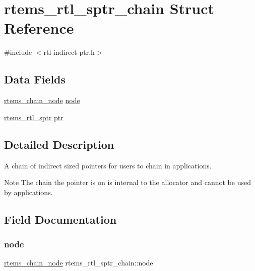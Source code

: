 \hypertarget{structrtems__rtl__sptr__chain}{}\section{rtems\+\_\+rtl\+\_\+sptr\+\_\+chain Struct Reference}
\label{structrtems__rtl__sptr__chain}


{\ttfamily \#include $<$rtl-\/indirect-\/ptr.\+h$>$}

\subsection*{Data Fields}
\begin{DoxyCompactItemize}
\item 
\mbox{\hyperlink{structChain__Node__struct}{rtems\+\_\+chain\+\_\+node}} \mbox{\hyperlink{structrtems__rtl__sptr__chain_ad99880c9889500827181225259851f71}{node}}
\item 
\mbox{\hyperlink{structrtems__rtl__sptr}{rtems\+\_\+rtl\+\_\+sptr}} \mbox{\hyperlink{structrtems__rtl__sptr__chain_a9786f950c8e835d599e0b1018350ca68}{ptr}}
\end{DoxyCompactItemize}


\subsection{Detailed Description}
A chain of indirect sized pointers for users to chain in applications.

\begin{DoxyNote}{Note}
The chain the pointer is on is internal to the allocator and cannot be used by applications. 
\end{DoxyNote}


\subsection{Field Documentation}
\mbox{\label{structrtems__rtl__sptr__chain_ad99880c9889500827181225259851f71}} 
\subsubsection{\texorpdfstring{node}{node}}
{\footnotesize\ttfamily \mbox{\hyperlink{structChain__Node__struct}{rtems\+\_\+chain\+\_\+node}} rtems\+\_\+rtl\+\_\+sptr\+\_\+chain\+::node}

